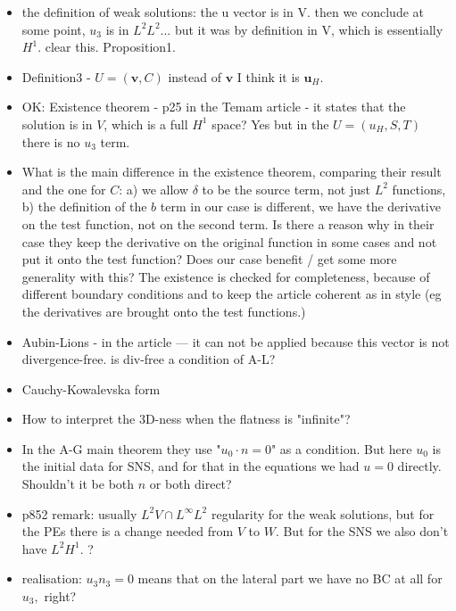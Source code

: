 \documentclass[11pt]{article}
\begin{document}
\begin{itemize}
\item the definition of weak solutions: the u vector is in V. then we conclude at some point, $u_3$ is in $L^2 L^2$... but it was by definition in V, which is essentially $H^1$. clear this. Proposition1.

\item Definition3 - $U = (\mathbf{v}, C)$ instead of $\mathbf{v}$ I think it is $\mathbf{u}_H.$

\item OK: Existence theorem - p25 in the Temam article - it states that the solution is in $V$, which is a full $H^1$ space? Yes but in the $U = (u_H, S, T)$ there is no $u_3$ term.

\item What is the main difference in the existence theorem, comparing their result and the one for $C$: a) we allow $\delta$ to be the source term, not just $L^2$ functions, b) the definition of the $b$ term in our case is different, we have the derivative on the test function, not on the second term. Is there a reason why in their case they keep the derivative on the original function in some cases and not put it onto the test function? Does our case benefit / get some more generality with this? The existence is checked for completeness, because of different boundary conditions and to keep the article coherent as in style (eg the derivatives are brought onto the test functions.)

\item Aubin-Lions - in the article --- it can not be applied because this vector is not divergence-free. is div-free a condition of A-L?

\item Cauchy-Kowalevska form

\item How to interpret the 3D-ness when the flatness is "infinite"?

\item In the A-G main theorem they use "$u_0 \cdot n = 0$" as a condition. But here $u_0$ is the initial data for SNS, and for that in the equations we had $u = 0$ directly. Shouldn't it be both $n$ or both direct?

\item p852 remark: usually $L^2 V \cap L^\infty L^2$ regularity for the weak solutions, but for the PEs there is a change needed from $V$ to $W$.  But for the SNS we also don't have $L^2 H^1$. ?

\item realisation: $u_3 n_3 = 0$ means that on the lateral part we have no BC at all for $u_3,$ right?


\end{itemize}
\end{document}

